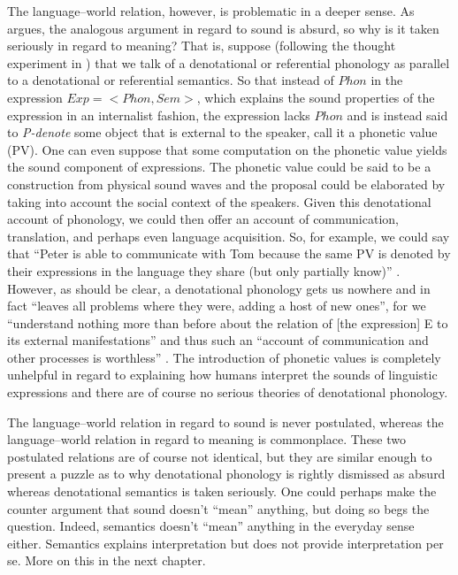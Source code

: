 The language--world relation, however, is problematic in a deeper sense. As \citet{Chomsky1995a,Chomsky2000,Chomsky2003a,Chomsky2003b} argues, the analogous argument in regard to sound is absurd, so why is it taken seriously in regard to meaning? That is, suppose (following the thought experiment in \citealt[270 ff.]{Chomsky2003b}) that we talk of a denotational or referential phonology as parallel to a denotational or referential semantics. So that instead of $Phon$ in the expression $Exp = <Phon,Sem>$, which explains the sound properties of the expression in an internalist fashion, the expression lacks $Phon$ and is instead said to \textit{P-denote} some object that is external to the speaker, call it a phonetic value (PV). One can even suppose that some computation on the phonetic value yields the sound component of expressions. The phonetic value could be said to be a construction from physical sound waves and the proposal could be elaborated by taking into account the social context of the speakers. Given this denotational account of phonology, we could then offer an account of communication, translation, and perhaps even language acquisition. So, for example, we could say that “Peter is able to communicate with Tom because the same PV is denoted by their expressions in the language they share (but only partially know)” \citep[271]{Chomsky2003b}. However, as should be clear, a denotational phonology gets us nowhere and in fact “leaves all problems where they were, adding a host of new ones”,  for we “understand nothing more than before about the relation of [the expression] E to its external manifestations” and thus such an “account of communication and other processes is worthless” \citep[271]{Chomsky2003b}. The introduction of phonetic values is completely unhelpful in regard to explaining how humans interpret the sounds of linguistic expressions and there are of course no serious theories of denotational phonology.

The language--world relation in regard to sound is never postulated, whereas the language--world relation in regard to meaning is commonplace. These two postulated relations are of course not identical, but they are similar enough to present a puzzle as to why denotational phonology is rightly dismissed as absurd whereas denotational semantics is taken seriously. One could perhaps make the counter argument that sound doesn’t “mean” anything, but doing so begs the question. Indeed, semantics doesn’t “mean” anything in the everyday sense either. Semantics explains interpretation but does not provide interpretation per se. More on this in the next chapter.


